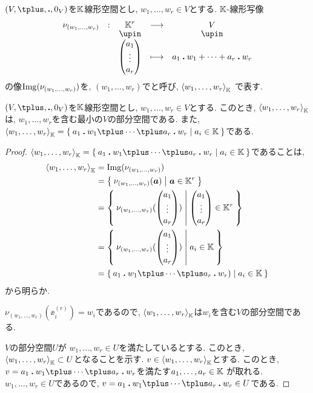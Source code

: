 \begin{definition}
  $(V,\plus,\act,0_V)$を$\mathbb{K}$線形空間とし,
  $w_1,\ldots,w_r\in V$とする.
  $\mathbb{K}$-線形写像
    \begin{align*}
      \shazo{\nu_{(w_1,\ldots,w_r)}}{\KK^r}{V}
      {\begin{pmatrix}a_1\\\vdots\\a_r\end{pmatrix}}{a_1\act w_1+\cdots+a_r\act w_r}
    \end{align*}
  の像$\operatorname{Img}(\nu_{(w_1,\ldots,w_r)})$を,
  $(w_1,\ldots,w_r)$でと呼び,
  $\Braket{w_1,\ldots,w_r}_{\mathbb{K}}$
  で表す.  
\end{definition}
\begin{remark}
  $(V,\plus,\act,0_V)$を$\mathbb{K}$線形空間とし,
  $w_1,\ldots,w_r\in V$とする.
  このとき,
  $\Braket{w_1,\ldots,w_r}_{\mathbb{K}}$
  は,
  $w_1,\ldots,w_r$を含む最小の$V$の部分空間である.
  また, 
  $\Braket{w_1,\ldots,w_r}_{\KK}=\Set{a_1\act w_1\plus\cdots\plus a_r\act w_r|a_i\in\KK}$である.
\end{remark}
\begin{proof}
$\Braket{w_1,\ldots,w_r}_{\KK}=\Set{a_1\act w_1\plus\cdots\plus a_r\act w_r|a_i\in\KK}$であることは,
\begin{align*}
\Braket{w_1,\ldots,w_r}_{\KK}
&=\Img(\nu_{(w_1,\ldots,w_r)})\\
&=\Set{\nu_{(w_1,\ldots,w_r)}(\aaa)|\aaa\in\KK^r}\\
&=\Set{\nu_{(w_1,\ldots,w_r)}(\begin{pmatrix}a_1\\\vdots\\a_r\end{pmatrix})|\begin{pmatrix}a_1\\\vdots\\a_r\end{pmatrix}\in\KK^r}\\
&=\Set{\nu_{(w_1,\ldots,w_r)}(\begin{pmatrix}a_1\\\vdots\\a_r\end{pmatrix})|a_i\in\KK}\\
&=\Set{a_1\act w_1\plus \cdots \plus a_r\act w_r)|a_i\in\KK}
\end{align*}
から明らか.

$\nu_{(w_1,\ldots,w_r)}(\ee^{(r)}_i)=w_i$であるので,
$\Braket{w_1,\ldots,w_r}_{\mathbb{K}}$は$w_i$を含む$V$の部分空間である.

$V$の部分空間$U$が
$w_1,\ldots,w_r\in U$を満たしているとする.
このとき, $\Braket{w_1,\ldots,w_r}_{\mathbb{K}}\subset U$となることを示す.
$v\in \Braket{w_1,\ldots,w_r}_{\mathbb{K}}$とする.
このとき,
$v=a_1\act w_1\plus \cdots \plus a_r\act w_r$を満たす$a_1,\ldots,a_r \in\mathbb{K}$
が取れる.
$w_1,\ldots,w_r\in U$であるので,
$v=a_1\act w_1\plus \cdots \plus a_r\act w_r\in U$である.
\end{proof}
